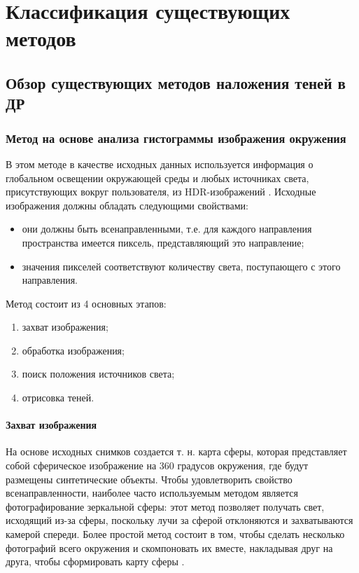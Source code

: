 \chapter{Классификация существующих методов}

\section{Обзор существующих методов наложения теней в ДР}

\subsection{Метод на основе анализа гистограммы изображения окружения}

В этом методе в качестве исходных данных используется информация о глобальном освещении окружающей среды и любых источниках света, присутствующих вокруг пользователя, из HDR-изображений \cite{hdri, osti2019real}. Исходные изображения должны обладать следующими свойствами:

\begin{itemize}
	\item они должны быть всенаправленными, т.е. для каждого направления пространства имеется пиксель, представляющий это направление;
	\item значения пикселей соответствуют количеству света, поступающего с этого направления.
\end{itemize}

Метод состоит из 4 основных этапов:

\begin{enumerate}
	\item захват изображения;
	\item обработка изображения;
	\item поиск положения источников света;
	\item отрисовка теней.
\end{enumerate}

\subsubsection*{Захват изображения}

На основе исходных снимков создается т. н. карта сферы, которая представляет собой сферическое изображение на 360 градусов окружения, где будут размещены синтетические объекты. Чтобы удовлетворить свойство всенаправленности, наиболее часто используемым методом является фотографирование зеркальной сферы: этот метод позволяет получать свет, исходящий из-за сферы, поскольку лучи за сферой отклоняются и захватываются камерой спереди. Более простой метод состоит в том, чтобы сделать несколько фотографий всего окружения и скомпоновать их вместе, накладывая друг на друга, чтобы сформировать карту сферы \cite{osti2019real}.


